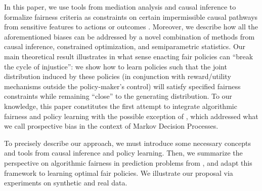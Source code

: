 \documentclass{article}
\newcommand{\red}{\textcolor{red}}
\begin{document}
In this paper, we use tools from mediation analysis and causal inference to formalize fairness criteria as constraints on certain impermissible causal pathways from sensitive features to actions or outcomes \cite{NabiShpitser18Fair}. Moreover, we describe how all the aforementioned biases can be addressed by a novel combination of methods from causal inference, constrained optimization, and semiparametric statistics. Our main theoretical result illustrates in what sense enacting fair policies can ``break the cycle of injustice'':
we show how to learn policies such that the joint distribution induced by these policies (in conjunction with reward/utility mechanisms outside the policy-maker's control) will satisfy specified fairness constraints while remaining ``close'' to the generating distribution.
To our knowledge, this paper constitutes the first attempt to integrate algorithmic fairness and policy learning with the possible exception of \citet{jabbari16fair}, which addressed what we call prospective bias in the context of Markov Decision Processes. 


To precisely describe our approach, we must introduce some necessary concepts and tools from causal inference and policy learning. Then, we summarize the perspective on algorithmic fairness in prediction problems from \citet{NabiShpitser18Fair}, and adapt this framework to learning optimal fair policies. We illustrate our proposal via experiments on synthetic and real data.
\end{document}
